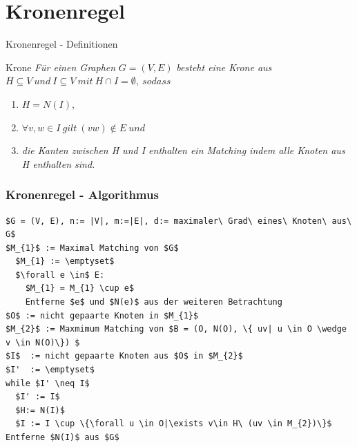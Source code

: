 \documentclass{beamer}
\begin{document}
\section{Kronenregel}

\begin{frame}{Kronenregel - Definitionen}
\begin{block}{Krone} 
\textit{Für einen Graphen} $G=(V,E)$ \textit{besteht eine Krone aus} $H \subseteq V\ und\ I \subseteq V\ mit\ H \cap I = \emptyset,\ sodass$  
\begin{enumerate}
\item $H = N(I),$  
\item $\forall v, w \in I\ gilt\ (vw) \notin E\ und$ 
\item \textit{die Kanten zwischen H und I enthalten ein Matching indem alle Knoten aus H enthalten sind.}
\end{enumerate}
\end{block}
\end{frame}

\begin{frame}[fragile]
\frametitle{Kronenregel - Algorithmus}
\begin{lstlisting}[mathescape=true, escapechar = !,basicstyle=\ttfamily\scriptsize]
$G = (V, E), n:= |V|, m:=|E|, d:= maximaler\ Grad\ eines\ Knoten\ aus\ G$
$M_{1}$ := Maximal Matching von $G$
  $M_{1} := \emptyset$
  $\forall e \in$ E:
    $M_{1} = M_{1} \cup e$
    Entferne $e$ und $N(e)$ aus der weiteren Betrachtung
$O$ := nicht gepaarte Knoten in $M_{1}$
$M_{2}$ := Maxmimum Matching von $B = (O, N(O), \{ uv| u \in O \wedge v \in N(O)\}) $
$I$  := nicht gepaarte Knoten aus $O$ in $M_{2}$
$I'  := \emptyset$
while $I' \neq I$
  $I' := I$
  $H:= N(I)$
  $I := I \cup \{\forall u \in O|\exists v\in H\ (uv \in M_{2})\}$
Entferne $N(I)$ aus $G$
\end{lstlisting}
\end{frame}
\end{document}
